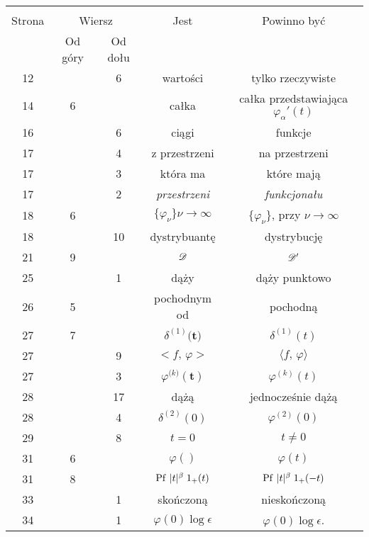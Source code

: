 \documentclass[a4paper,11pt]{article}
\begin{document}
\begin{center}

  \begin{tabular}{|c|c|c|c|c|}
    \hline
    & \multicolumn{2}{c|}{} & & \\
    Strona & \multicolumn{2}{c|}{Wiersz} & Jest
                              & Powinno być \\ \cline{2-3}
    & Od góry & Od dołu & & \\
    \hline
    12  & &  6 & wartości & tylko rzeczywiste \\
    14  &  6 & & całka & całka przedstawiająca $\varphi_{ \alpha }'( t )$ \\
    16  & &  6 & ciągi & funkcje \\
    17  & &  4 & z przestrzeni & na przestrzeni \\
    17  & &  3 & która ma & które mają \\
    17  & &  2 & \textit{przestrzeni} & \textit{funkcjonału} \\
    18  &  6 & & $\{ \varphi_{ \nu } \}\nu \to \infty$
           & $\{ \varphi_{ \nu } \}$, przy $\nu \to \infty$ \\
    18  & & 10 & dystrybuantę & dystrybucję \\
    21  &  9 & & $\mathcal{D}$ & $\mathcal{D}'$ \\
    25  & &  1 & dąży & dąży punktowo \\
    26  &  5 & & pochodnym od & pochodną \\
    27  &  7 & & $\delta^{ ( 1 ) }\boldsymbol{ ( t } )$ & $\delta^{ ( 1 ) }( t )$ \\
    27  & &  9 & $< f,\, \varphi >$ & $\langle f, \, \varphi \rangle$ \\
    27  & &  3 & $\varphi^{ ( k \boldsymbol{ ) } }\boldsymbol{ ( t ) } $
           & $\varphi^{ ( k ) }( t )$ \\
    28  & & 17 & dążą & jednocześnie dążą \\
    28  & &  4 & $\delta^{ ( 2 ) }( 0 )$ & $\varphi^{ ( 2 ) }( 0 )$ \\
    29  & &  8 & $t = 0$ & $t \neq 0$ \\
    31  &  6 & & $\varphi( )$ & $\varphi( t )$ \\
    31  &  8 & & $\mathrm{Pf}\, \, | t |^{ \beta } \; 1_{ + }( t )$
           & $\mathrm{Pf}\, \, | t |^{ \beta } \; 1_{ + }( -t )$ \\
    33  & &  1 & skończoną & nieskończoną \\
    34  & &  1 & $\varphi( 0 ) \log \epsilon$ & $\varphi( 0 ) \log \epsilon$. \\

\end{tabular}
\end{center}
\end{document}
